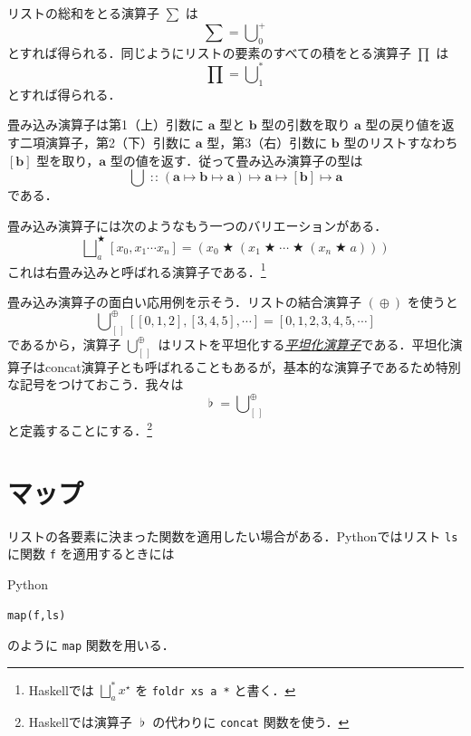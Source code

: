 \documentclass[a4paper]{jsbook}
\newcommand{\programminglanguage}[1]{\textsf{#1}}
\newcommand{\haskell}{\programminglanguage{Haskell}}
\newcommand{\python}{\programminglanguage{Python}}
\newcommand{\keyword}[1]{{\underline{\emph{#1}}}}
\newcommand{\code}[1]{\texttt{#1}}
\newenvironment{pythoncode}{\begin{itembox}[r]{\python}}{\end{itembox}}
\newcommand{\mListWith}[1]{\left[#1\right]}
\newcommand{\mType}[1]{\mathbf{#1}}
\newcommand{\mListType}[1]{\mListWith{\mType{#1}}}
\newcommand{\mEmptyList}{{[\,]}}
\newcommand{\mList}[1]{{#1}^\mathrm{\star}}
\DeclareMathOperator{\mIn}{{:\!:}}
\DeclareMathOperator{\mMapsTo}{\mapsto}
\DeclareMathOperator{\mBinOp}{\bigstar}
\DeclareMathOperator*{\mFold}{\bigcup}
\DeclareMathOperator*{\mFoldRight}{\bigsqcup}
\DeclareMathOperator{\mConcat}{\flat}
\DeclareMathOperator{\mAppend}{\oplus}
\newcommand{\mProj}[2]{#1\mMapsTo#2}
\begin{document}
リストの総和をとる演算子 $\sum$ は
\begin{equation}
\sum=\mFold^+_0
\end{equation}
とすれば得られる．同じようにリストの要素のすべての積をとる演算子 $\prod$ は
\begin{equation}
\prod=\mFold^*_1
\end{equation}
とすれば得られる．

畳み込み演算子は第1（上）引数に $\mType{a}$ 型と $\mType{b}$ 型の引数を取り $\mType{a}$ 型の戻り値を返す二項演算子，第2（下）引数に $\mType{a}$ 型，第3（右）引数に $\mType{b}$ 型のリストすなわち $\mListType{b}$ 型を取り，$\mType{a}$ 型の値を返す．従って畳み込み演算子の型は
\begin{equation}
\mFold
\mIn{}
\mProj{
  \mProj{
    \mProj{
      (\mProj{\mType{a}}{\mProj{\mType{b}}{\mType{a}}})
    }
    {\mType{a}}
  }
  {
    \mListType{b}
  }
}
{
  \mType{a}
}
\end{equation}
である．

畳み込み演算子には次のようなもう一つのバリエーションがある．
\begin{equation}
\mFoldRight^{\mBinOp}_{a}\mListWith{x_0,x_1\dotsb x_n}
=(x_0\mBinOp(x_1\mBinOp\dotsb\mBinOp(x_n\mBinOp a)))
\end{equation}
これは右畳み込みと呼ばれる演算子である．\footnote{\haskell では $\mFoldRight^{*}_a\mList{x}$ を \code{foldr xs a *} と書く．}

畳み込み演算子の面白い応用例を示そう．リストの結合演算子 $(\mAppend)$ を使うと
\begin{equation}
\mFold_\mEmptyList^{\mAppend}\mListWith{\mListWith{0,1,2},\mListWith{3,4,5},\dotsb}=\mListWith{0,1,2,3,4,5,\dotsb}
\end{equation}
であるから，演算子 $\mFold_\mEmptyList^{\mAppend}$ はリストを平坦化する\keyword{平坦化演算子}である．平坦化演算子はconcat演算子とも呼ばれることもあるが，基本的な演算子であるため特別な記号をつけておこう．我々は
\begin{equation}
\mConcat=\mFold_\mEmptyList^{\mAppend}
\end{equation}
と定義することにする．\footnote{\haskell では演算子 $\mConcat$ の代わりに \code{concat} 関数を使う．}

\section{マップ}

リストの各要素に決まった関数を適用したい場合がある．\python ではリスト \code{ls} に関数 \code{f} を適用するときには
\begin{pythoncode}
\begin{verbatim}
map(f,ls)
\end{verbatim}
\end{pythoncode}
のように \code{map} 関数を用いる．
\end{document}
